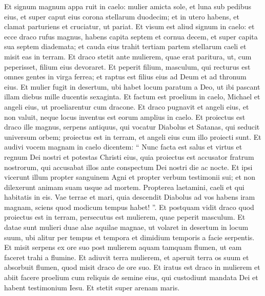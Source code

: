 \begin{biblechapter}
\begin{biblechapter}
\begin{biblechapter}
\begin{biblechapter}
\begin{biblechapter}
\begin{biblechapter}
\begin{biblechapter}
\begin{biblechapter}
\begin{biblechapter}
\begin{biblechapter}
\begin{biblechapter}
\begin{biblechapter}
\verse Et signum magnum appa ruit in caelo: mulier amicta sole, et luna sub pedibus eius, et super caput eius corona stellarum duodecim; 
\verse et in utero habens, et clamat parturiens et cruciatur, ut pariat. 
\verse Et visum est aliud signum in caelo: et ecce draco rufus magnus, habens capita septem et cornua decem, et super capita sua septem diademata; 
\verse et cauda eius trahit tertiam partem stellarum caeli et misit eas in terram. Et draco stetit ante mulierem, quae erat paritura, ut, cum peperisset, filium eius devoraret. 
\verse Et peperit filium, masculum, qui recturus est omnes gentes in virga ferrea; et raptus est filius eius ad Deum et ad thronum eius. 
\verse Et mulier fugit in desertum, ubi habet locum paratum a Deo, ut ibi pascant illam diebus mille ducentis sexaginta.
 \verse Et factum est proelium in caelo, Michael et angeli eius, ut proeliarentur cum dracone. Et draco pugnavit et angeli eius, 
\verse et non valuit, neque locus inventus est eorum amplius in caelo. 
\verse Et proiectus est draco ille magnus, serpens antiquus, qui vocatur Diabolus et Satanas, qui seducit universum orbem; proiectus est in terram, et angeli eius cum illo proiecti sunt. 
\verse Et audivi vocem magnam in caelo dicentem:
 “ Nunc facta est salus et virtus et regnum Dei nostri
 et potestas Christi eius,
 quia proiectus est accusator fratrum nostrorum,
 qui accusabat illos ante conspectum Dei nostri die ac nocte.
 \verse Et ipsi vicerunt illum propter sanguinem Agni
 et propter verbum testimonii sui;
 et non dilexerunt animam suam
 usque ad mortem.
 \verse Propterea laetamini, caeli
 et qui habitatis in eis.
 Vae terrae et mari, quia descendit Diabolus ad vos habens iram magnam, sciens quod modicum tempus habet! ”.
 \verse Et postquam vidit draco quod proiectus est in terram, persecutus est mulierem, quae peperit masculum. 
\verse Et datae sunt mulieri duae alae aquilae magnae, ut volaret in desertum in locum suum, ubi alitur per tempus et tempora et dimidium temporis a facie serpentis. 
\verse Et misit serpens ex ore suo post mulierem aquam tamquam flumen, ut eam faceret trahi a flumine. 
\verse Et adiuvit terra mulierem, et aperuit terra os suum et absorbuit flumen, quod misit draco de ore suo.
 \verse Et iratus est draco in mulierem et abiit facere proelium cum reliquis de semine eius, qui custodiunt mandata Dei et habent testimonium Iesu.
 \verse Et stetit super arenam maris.
 

\end{biblechapter}
\end{biblechapter}
\end{biblechapter}
\end{biblechapter}
\end{biblechapter}
\end{biblechapter}
\end{biblechapter}
\end{biblechapter}
\end{biblechapter}
\end{biblechapter}
\end{biblechapter}
\end{biblechapter}
